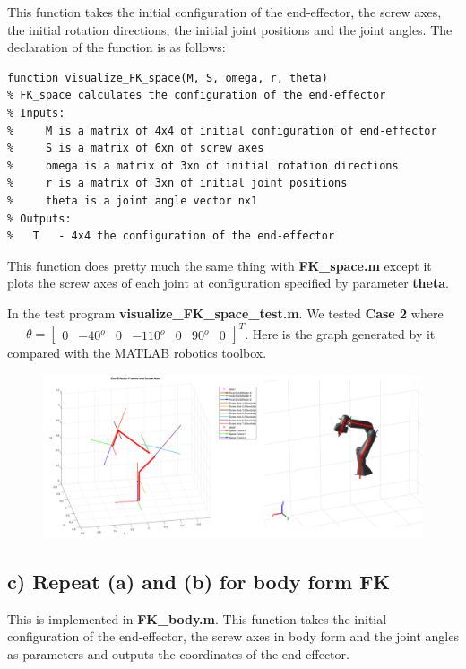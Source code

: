 \documentclass[english,10pt,a4paper]{article}
\begin{document}
    This function takes the initial configuration of the end-effector, the screw axes, the initial rotation directions, the initial joint positions and the joint angles. The declaration of the function is as follows:
    \begin{lstlisting}[style=matlab]
function visualize_FK_space(M, S, omega, r, theta)
% FK_space calculates the configuration of the end-effector
% Inputs:
%     M is a matrix of 4x4 of initial configuration of end-effector
%     S is a matrix of 6xn of screw axes
%     omega is a matrix of 3xn of initial rotation directions
%     r is a matrix of 3xn of initial joint positions
%     theta is a joint angle vector nx1
% Outputs:
%   T   - 4x4 the configuration of the end-effector
    \end{lstlisting}
    This function does pretty much the same thing with \textbf{FK\_space.m} except it plots the screw axes of each joint at configuration specified by parameter \textbf{theta}.
	
    In the test program \textbf{visualize\_FK\_space\_test.m}. We tested \textbf{Case 2} where \ \ \ $\theta = \begin{bmatrix}
        0 & -40^o & 0 & -110^o & 0 & 90^o & 0
    \end{bmatrix}^T$. Here is the graph generated by it compared with the MATLAB robotics toolbox.
    \begin{figure}[H]
        \includegraphics[scale=0.5]{p2t1.png}
    \end{figure}
    \subsection*{c) Repeat (a) and (b) for body form FK}
    This is implemented in \textbf{FK\_body.m}. This function takes the initial configuration of the end-effector, the screw axes in body form and the joint angles as parameters and outputs the coordinates of the end-effector.
    
\end{document}

